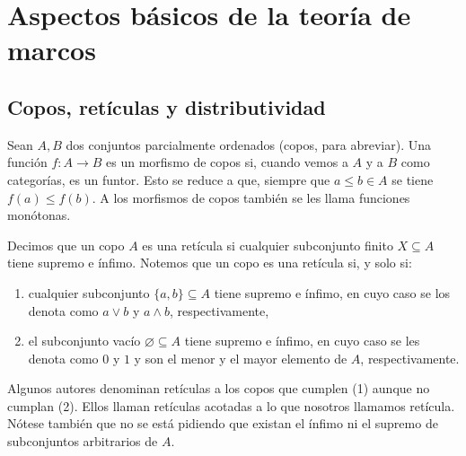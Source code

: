 \documentclass[12pt,letterpaper,titlepage]{article}
\let\emptyset\varnothing
\theoremstyle{definition}
\renewcommand\sup{\vee}
\renewcommand\inf{\wedge}
\newcommand\<{\langle}
\renewcommand\>{\rangle}
\begin{document}
\section{Aspectos básicos de la teoría de marcos}
\subsection{Copos, retículas y distributividad}
Sean $A,B$ dos conjuntos parcialmente ordenados
(copos, para abreviar).
Una función $f:A\to B$ es un morfismo de copos
si, cuando vemos a $A$ y a $B$ como categorías, es un funtor.
Esto se reduce a que, siempre que $a\leq b\in A$
se tiene $f(a)\leq f(b)$.
A los morfismos de copos también se les llama funciones monótonas.

Decimos que un copo $A$ es una retícula si cualquier
subconjunto finito $X\subseteq A$ tiene supremo e ínfimo.
Notemos que un copo es una retícula si, y solo si:
\begin{enumerate}
    \item cualquier subconjunto $\{a,b\}\subseteq A$ tiene supremo
    e ínfimo, en cuyo caso se los denota como $a\sup b$ y $a\inf b$,
    respectivamente,
    \item el subconjunto vacío $\emptyset\subseteq A$ tiene
    supremo e ínfimo, en cuyo caso se les denota como $0$ y $1$
    y son el menor y el mayor elemento de $A$, respectivamente.
\end{enumerate}
Algunos autores denominan retículas a los copos que
cumplen (1) aunque no cumplan (2).
Ellos llaman retículas acotadas a lo que nosotros llamamos retícula.
Nótese también que no se está pidiendo que existan el ínfimo
ni el supremo de subconjuntos arbitrarios de $A$.
\end{document}
